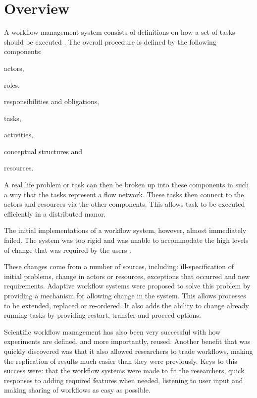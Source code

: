 \documentclass[12pt,a4paper]{report}
\begin{document}
\section{Overview}
A workflow management system consists of definitions on how a set of tasks
should be executed \cite{springerlink:10.1007/BF00136712,vanderAalst2002125}.
The overall procedure is defined by the following components:
\begin{inparaenum}[(i)] \item actors, \item roles, \item responsibilities and
obligations, \item tasks, \item activities,\item conceptual structures and
\item resources.\end{inparaenum}

A real life problem or task can then be broken up into these components in
such a way that the tasks represent a flow network. These tasks then connect to
the actors and resources via the other
components\cite[p.~4]{Taylor:2006:WES:1196459}.  This allows task to be
executed efficiently in a distributed manor.

The initial implementations of a workflow system, however, almost
immediately failed. The system was too rigid and was unable to accommodate the
high levels of change that was required by the users
\cite{Suchman:1983:OPP:357442.357445}.

These changes come from a number of sources, including: ill-specification
of initial problems, change in actors or resources, exceptions that occurred
and new requirements.  Adaptive workflow systems were proposed to solve this
problem by providing a mechanism for allowing change in the
system\cite{vanderAalst2002125}. This allows processes to be extended, replaced
or re-ordered. It also adds the ability to change already running tasks by
providing restart, transfer and proceed options.

Scientific workflow management has also been very successful with how
experiments are defined, and more importantly, reused. Another benefit that was
quickly discovered was that it also allowed researchers to trade workflows,
making the replication of results much easier than they were
previously\cite{4721191}. Keys to this success were: that the workflow systems
were made to fit the researchers, quick responses to adding required features
when needed, listening to user input and making sharing of workflows as easy as
possible.
\end{document}
